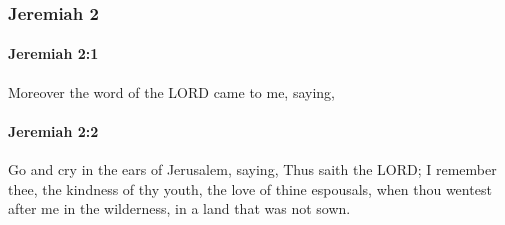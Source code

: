 	\subsubsection{Jeremiah 2} %
		\label{JEREMIAH-2}

		\paragraph{Jeremiah 2:1} %
			\label{JEREMIAH-2-1}

			Moreover the word of the LORD came to me, saying,


		\paragraph{Jeremiah 2:2} %
			\label{JEREMIAH-2-2}

			Go and cry in the ears of Jerusalem, saying, Thus saith the LORD; I remember thee, the kindness of thy youth, the love of thine espousals, when thou wentest after me in the wilderness, in a land that was not sown.


